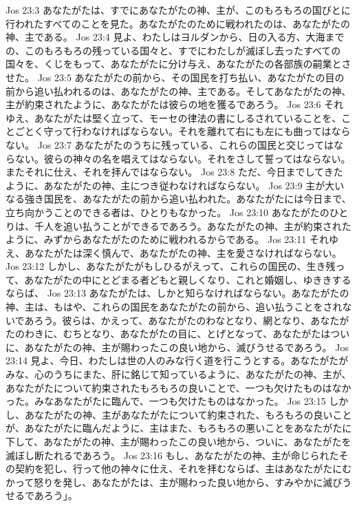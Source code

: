 Jos 23:3  あなたがたは、すでにあなたがたの神、主が、このもろもろの国びとに行われたすべてのことを見た。あなたがたのために戦われたのは、あなたがたの神、主である。
Jos 23:4  見よ、わたしはヨルダンから、日の入る方、大海までの、このもろもろの残っている国々と、すでにわたしが滅ぼし去ったすべての国々を、くじをもって、あなたがたに分け与え、あなたがたの各部族の嗣業とさせた。
Jos 23:5  あなたがたの前から、その国民を打ち払い、あなたがたの目の前から追い払われるのは、あなたがたの神、主である。そしてあなたがたの神、主が約束されたように、あなたがたは彼らの地を獲るであろう。
Jos 23:6  それゆえ、あなたがたは堅く立って、モーセの律法の書にしるされていることを、ことごとく守って行わなければならない。それを離れて右にも左にも曲ってはならない。
Jos 23:7  あなたがたのうちに残っている、これらの国民と交じってはならない。彼らの神々の名を唱えてはならない。それをさして誓ってはならない。またそれに仕え、それを拝んではならない。
Jos 23:8  ただ、今日までしてきたように、あなたがたの神、主につき従わなければならない。
Jos 23:9  主が大いなる強き国民を、あなたがたの前から追い払われた。あなたがたには今日まで、立ち向かうことのできる者は、ひとりもなかった。
Jos 23:10  あなたがたのひとりは、千人を追い払うことができるであろう。あなたがたの神、主が約束されたように、みずからあなたがたのために戦われるからである。
Jos 23:11  それゆえ、あなたがたは深く慎んで、あなたがたの神、主を愛さなければならない。
Jos 23:12  しかし、あなたがたがもしひるがえって、これらの国民の、生き残って、あなたがたの中にとどまる者どもと親しくなり、これと婚姻し、ゆききするならば、
Jos 23:13  あなたがたは、しかと知らなければならない。あなたがたの神、主は、もはや、これらの国民をあなたがたの前から、追い払うことをされないであろう。彼らは、かえって、あなたがたのわなとなり、網となり、あなたがたのわきに、むちとなり、あなたがたの目に、とげとなって、あなたがたはついに、あなたがたの神、主が賜わったこの良い地から、滅びうせるであろう。
Jos 23:14  見よ、今日、わたしは世の人のみな行く道を行こうとする。あなたがたがみな、心のうちにまた、肝に銘じて知っているように、あなたがたの神、主が、あなたがたについて約束されたもろもろの良いことで、一つも欠けたものはなかった。みなあなたがたに臨んで、一つも欠けたものはなかった。
Jos 23:15  しかし、あなたがたの神、主があなたがたについて約束された、もろもろの良いことが、あなたがたに臨んだように、主はまた、もろもろの悪いことをあなたがたに下して、あなたがたの神、主が賜わったこの良い地から、ついに、あなたがたを滅ぼし断たれるであろう。
Jos 23:16  もし、あなたがたの神、主が命じられたその契約を犯し、行って他の神々に仕え、それを拝むならば、主はあなたがたにむかって怒りを発し、あなたがたは、主が賜わった良い地から、すみやかに滅びうせるであろう」。

